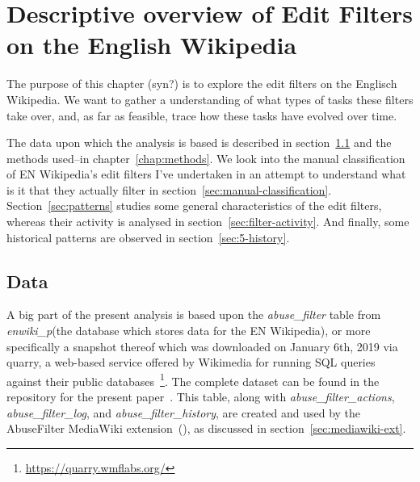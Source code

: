 \chapter{Descriptive overview of Edit Filters on the English Wikipedia}
\label{chap:overview-en-wiki}

The purpose of this chapter (syn?) is to explore the edit filters on the Englisch Wikipedia.
We want to gather a understanding of what types of tasks these filters take over,
and, as far as feasible, trace how these tasks have evolved over time.

The data upon which the analysis is based is described in section~\ref{sec:overview-data}
and the methods used–in chapter~\ref{chap:methods}.
We look into the manual classification of EN Wikipedia's edit filters I've undertaken in an attempt to understand what is it that they actually filter in section~\ref{sec:manual-classification}.
Section~\ref{sec:patterns} studies some general characteristics of the edit filters, whereas their activity is analysed in section~\ref{sec:filter-activity}.
And finally, some historical patterns are observed in section~\ref{sec:5-history}.



\section{Data}
\label{sec:overview-data}

A big part of the present analysis is based upon the \emph{abuse\_filter} table from \emph{enwiki\_p}(the database which stores data for the EN Wikipedia), or more specifically a snapshot thereof which was downloaded on January 6th, 2019 via quarry, a web-based service offered by Wikimedia for running SQL queries against their public databases~\footnote{\url{https://quarry.wmflabs.org/}}.
The complete dataset can be found in the repository for the present paper~\cite{github}. %
This table, along with \emph{abuse\_filter\_actions}, \emph{abuse\_filter\_log}, and \emph{abuse\_filter\_history}, are created and used by the AbuseFilter MediaWiki extension~(\cite{gerrit-abusefilter-tables}), as discussed in section~\ref{sec:mediawiki-ext}.

